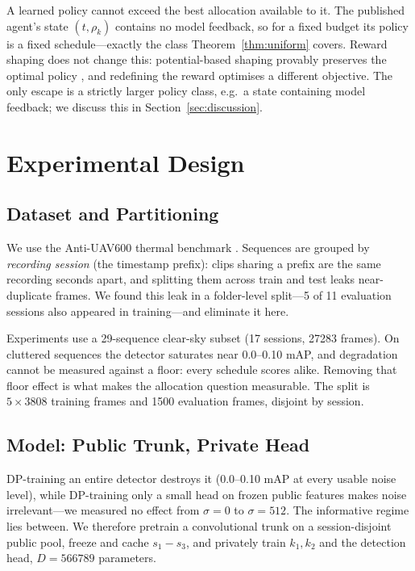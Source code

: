 A learned policy cannot exceed the best allocation available to it. The published
agent's state $(t,\rho_k)$ contains no model feedback, so for a fixed budget its
policy is a fixed schedule---exactly the class Theorem~\ref{thm:uniform} covers.
Reward shaping does not change this: potential-based shaping provably preserves
the optimal policy \citep{ng1999policy}, and redefining the reward optimises a
different objective. The only escape is a strictly larger policy class, e.g.\ a
state containing model feedback; we discuss this in
Section~\ref{sec:discussion}.


\chapter{Experimental Design}
\label{sec:calibration}

\section{Dataset and Partitioning}

We use the Anti-UAV600 thermal benchmark \citep{zhao2023antiuav}. Sequences are grouped by
\emph{recording session} (the timestamp prefix): clips sharing a prefix are the
same recording seconds apart, and splitting them across train and test leaks
near-duplicate frames. We found this leak in a folder-level split---5 of 11
evaluation sessions also appeared in training---and eliminate it here.

Experiments use a 29-sequence clear-sky subset (17 sessions, \num{27283} frames).
On cluttered sequences the detector saturates near \num{0.0}--\num{0.10} mAP, and
degradation cannot be measured against a floor: every schedule scores alike.
Removing that floor effect is what makes the allocation question measurable. The
split is $5\times\num{3808}$ training frames and \num{1500} evaluation frames,
disjoint by session.

\section{Model: Public Trunk, Private Head}

DP-training an entire detector destroys it (\num{0.0}--\num{0.10} mAP at every
usable noise level), while DP-training only a small head on frozen public
features makes noise irrelevant---we measured no effect from $\sigma=0$ to
$\sigma=512$. The informative regime lies between. We therefore pretrain a
convolutional trunk on a session-disjoint public pool, freeze and cache
$s_1\!-\!s_3$, and privately train $k_1,k_2$ and the detection head,
$D=\num{566789}$ parameters.

